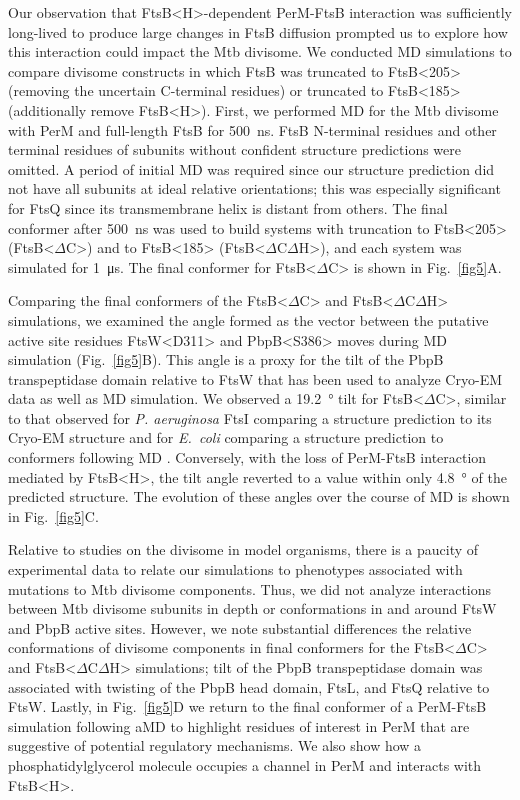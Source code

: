 \documentclass[twocolumn,pdflatex,sn-nature]{sn-jnl}%
\def\textsuperscript#1{<#1>}%
\newcommand\ec{\textit{E.~coli}}
\newcommand\mtb{Mtb}
\newcommand\pa{\textit{P. aeruginosa}}
\newcommand\ftsbH{FtsB\textsuperscript{H}}
\newcommand\ftsbdCdH{FtsB\textsuperscript{$\Delta{}$C$\Delta{}$H}}
\newcommand\ftsbdC{FtsB\textsuperscript{$\Delta{}$C}}
\begin{document}
Our observation that \ftsbH{}-dependent PerM-FtsB interaction was sufficiently long-lived to produce large changes in FtsB diffusion prompted us to explore how this interaction could impact the \mtb{} divisome.
We conducted MD simulations to compare divisome constructs in which FtsB was truncated to FtsB\textsuperscript{205} (removing the uncertain C-terminal residues) or truncated to FtsB\textsuperscript{185} (additionally remove \ftsbH{}).
First, we performed MD for the \mtb{} divisome with PerM and full-length FtsB for \qty{500}{\ns}. FtsB N-terminal residues and other terminal residues of subunits without confident structure predictions were omitted.
A period of initial MD was required since our structure prediction did not have all subunits at ideal relative orientations; this was especially significant for FtsQ since its transmembrane helix is distant from others.
The final conformer after \qty{500}{\ns} was used to build systems with truncation to FtsB\textsuperscript{205} (\ftsbdC{}) and to FtsB\textsuperscript{185} (\ftsbdCdH{}), and each system was simulated for \qty{1}{\us}.
The final conformer for \ftsbdC{} is shown in Fig.~\ref{fig5}A.

Comparing the final conformers of the \ftsbdC{} and \ftsbdCdH{} simulations, we examined the angle formed as the vector between the putative active site residues FtsW\textsuperscript{D311} and PbpB\textsuperscript{S386} moves during MD simulation (Fig.~\ref{fig5}B).
This angle is a proxy for the tilt of the PbpB transpeptidase domain relative to FtsW that has been used to analyze Cryo-EM data as well as MD simulation.
We observed a \qty{19.2}{\degree} tilt for \ftsbdC{}, similar to that observed for \pa{} FtsI comparing a structure prediction to its Cryo-EM structure \citep{kashammerCryoEMStructureBacterial2023} and for \ec{} comparing a structure prediction to conformers following MD \citep{brittonConformationalChangesEssential2023}.
Conversely, with the loss of PerM-FtsB interaction mediated by \ftsbH{}, the tilt angle reverted to a value within only \qty{4.8}{\degree} of the predicted structure.
The evolution of these angles over the course of MD is shown in Fig.~\ref{fig5}C.

Relative to studies on the divisome in model organisms, there is a paucity of experimental data to relate our simulations to phenotypes associated with mutations to \mtb{} divisome components.
Thus, we did not analyze interactions between \mtb{} divisome subunits in depth or conformations in and around FtsW and PbpB active sites.
However, we note substantial differences the relative conformations of divisome components in final conformers for the \ftsbdC{} and \ftsbdCdH{} simulations; tilt of the PbpB transpeptidase domain was associated with twisting of the PbpB head domain, FtsL, and FtsQ relative to FtsW.
Lastly, in Fig.~\ref{fig5}D we return to the final conformer of a PerM-FtsB simulation following aMD to highlight residues of interest in PerM that are suggestive of potential regulatory mechanisms.
We also show how a phosphatidylglycerol molecule occupies a channel in PerM and interacts with \ftsbH{}.
\end{document}
